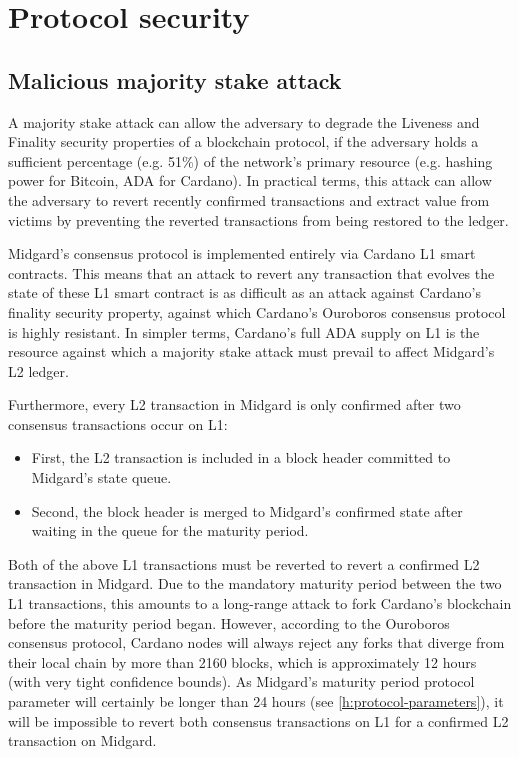 \documentclass[../midgard.tex]{subfiles}
\begin{document}
\section{Protocol security}
\label{h:protocol-security}

\subsection{Malicious majority stake attack}
\label{h:malicious-majority-stake-attack}

A majority stake attack can allow the adversary to degrade the Liveness and Finality security properties of a blockchain protocol, if the adversary holds a sufficient percentage (e.g. 51\%) of the network's primary resource (e.g. hashing power for Bitcoin, ADA for Cardano).
In practical terms, this attack can allow the adversary to revert recently confirmed transactions and extract value from victims by preventing the reverted transactions from being restored to the ledger.

Midgard's consensus protocol is implemented entirely via Cardano L1 smart contracts.
This means that an attack to revert any transaction that evolves the state of these L1 smart contract is as difficult as an attack against Cardano's finality security property, against which Cardano's Ouroboros consensus protocol is highly resistant.
In simpler terms, Cardano's full ADA supply on L1 is the resource against which a majority stake attack must prevail to affect Midgard's L2 ledger.

Furthermore, every L2 transaction in Midgard is only confirmed after two consensus transactions occur on L1:
\begin{itemize}
  \item First, the L2 transaction is included in a block header committed to Midgard's state queue.
  \item Second, the block header is merged to Midgard's confirmed state after waiting in the queue for the maturity period.
\end{itemize}

Both of the above L1 transactions must be reverted to revert a confirmed L2 transaction in Midgard.
Due to the mandatory maturity period between the two L1 transactions, this amounts to a long-range attack to fork Cardano's blockchain before the maturity period began.
However, according to the Ouroboros consensus protocol, Cardano nodes will always reject any forks that diverge from their local chain by more than 2160 blocks, which is approximately 12 hours (with very tight confidence bounds).
As Midgard's maturity period protocol parameter will certainly be longer than 24 hours (see \cref{h:protocol-parameters}), it will be impossible to revert both consensus transactions on L1 for a confirmed L2 transaction on Midgard.
\end{document}
